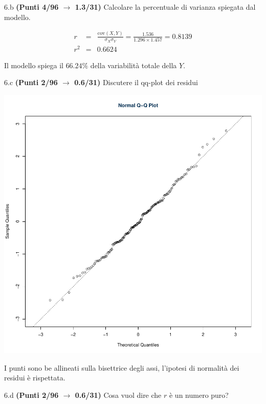 \documentclass[
  11pt,
]{book}
\theoremstyle{mytheoremstyle}
\theoremstyle{mydefstyle}
\newenvironment{sol}
  {
  \begin{tcolorbox}[enhanced,breakable,arc=0.1mm,boxrule=1pt,colback=white,colframe=iblue,
  title=\bf \fontfamily{lmss}\selectfont \hspace{.5 cm} Soluzione,drop fuzzy shadow]

}{
\end{tcolorbox}
  }
\begin{document}
6.b \textbf{(Punti 4/96 \(\rightarrow\) 1.3/31)} Calcolare la percentuale di varianza spiegata dal modello.

\begin{sol}
\begin{eqnarray*}
r&=&\frac{\text{cov}(X,Y)}{\sigma_X\sigma_Y}=\frac{ 1.536 }{ 1.296 \times 1.457 }= 0.8139 \\ 
r^2&=& 0.6624\end{eqnarray*}

Il modello spiega il \(66.24\%\) della variabilità totale della \(Y\).

\end{sol}

6.c \textbf{(Punti 2/96 \(\rightarrow\) 0.6/31)} Discutere il qq-plot dei residui

\begin{center}\includegraphics{Esami_passati_con_soluzioni_files/figure-latex/2021-7,-1} \end{center}

\begin{sol}
I punti sono be allineati sulla bisettrice degli assi, l'ipotesi di normalità dei residui è rispettata.

\end{sol}

6.d \textbf{(Punti 2/96 \(\rightarrow\) 0.6/31)} Cosa vuol dire che \(r\) è un numero puro?
\end{document}
